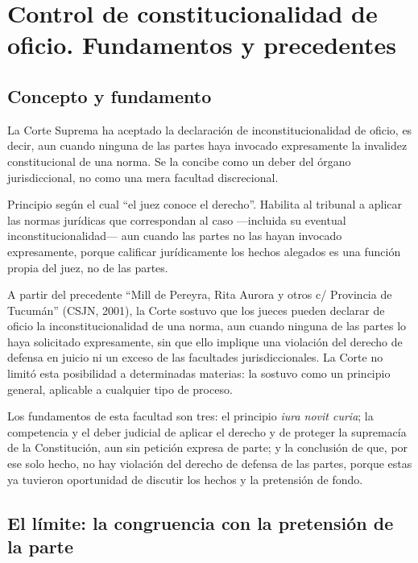 \documentclass[12pt,oneside]{book}
\begin{document}
\chapter{Control de constitucionalidad de oficio. Fundamentos y precedentes}
\label{cap:p7}

\section{Concepto y fundamento}

La Corte Suprema ha aceptado la declaración de inconstitucionalidad de oficio, es
decir, aun cuando ninguna de las partes haya invocado expresamente la invalidez
constitucional de una norma. Se la concibe como un deber del órgano jurisdiccional,
no como una mera facultad discrecional.

\begin{defbox}
Principio según el cual ``el juez conoce el derecho''. Habilita al tribunal a
aplicar las normas jurídicas que correspondan al caso —incluida su eventual
inconstitucionalidad— aun cuando las partes no las hayan invocado expresamente,
porque calificar jurídicamente los hechos alegados es una función propia del
juez, no de las partes.
\end{defbox}

A partir del precedente ``Mill de Pereyra, Rita Aurora y otros c/ Provincia de
Tucumán'' (CSJN, 2001), la Corte sostuvo que los jueces pueden declarar de oficio
la inconstitucionalidad de una norma, aun cuando ninguna de las partes lo haya
solicitado expresamente, sin que ello implique una violación del derecho de
defensa en juicio ni un exceso de las facultades jurisdiccionales. La Corte no
limitó esta posibilidad a determinadas materias: la sostuvo como un principio
general, aplicable a cualquier tipo de proceso.

Los fundamentos de esta facultad son tres: el principio \textit{iura novit
curia}; la competencia y el deber judicial de aplicar el derecho y de proteger la
supremacía de la Constitución, aun sin petición expresa de parte; y la conclusión
de que, por ese solo hecho, no hay violación del derecho de defensa de las
partes, porque estas ya tuvieron oportunidad de discutir los hechos y la
pretensión de fondo.

\section{El límite: la congruencia con la pretensión de la parte}
\end{document}
